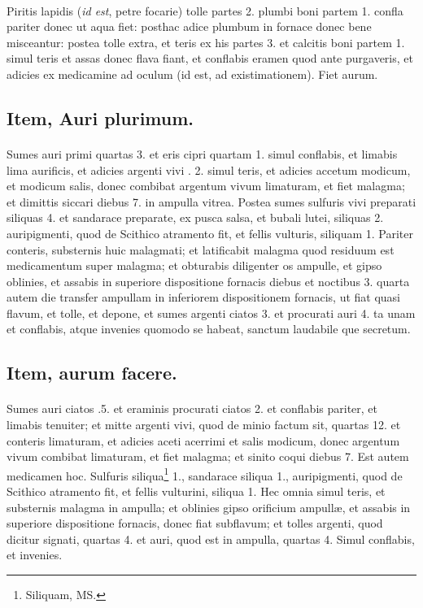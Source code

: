 \documentclass[a4paper, 11pt, oneside, polutonikogreek, italian]{article}
\begin{document}
\paragraph{}
Piritis lapidis (\emph{id est}, petre focarie) tolle partes 2. plumbi boni partem 1. confla pariter donec ut aqua fiet: posthac adice plumbum in fornace donec bene misceantur: postea tolle extra, et teris ex his partes 3. et calcitis boni partem 1. simul teris et assas donec flava fiant, et conflabis eramen quod ante purgaveris, et adicies ex medicamine ad oculum (id est, ad existimationem). Fiet aurum.

\subsection{Item, Auri plurimum.}
\paragraph{}
Sumes auri primi quartas 3. et eris cipri quartam 1. simul conflabis, et limabis lima aurificis, et adicies argenti vivi \roundz. 2. simul teris, et adicies accetum modicum, et modicum salis, donec combibat argentum vivum limaturam, et fiet malagma; et dimittis siccari diebus 7. in ampulla vitrea. Postea sumes sulfuris vivi preparati siliquas 4. et sandarace preparate, ex pusca salsa, et bubali lutei, siliquas 2. auripigmenti, quod de Scithico atramento fit, et fellis vulturis, siliquam 1. Pariter conteris, substernis huic malagmati; et latificabit malagma quod residuum est medicamentum super malagma; et obturabis diligenter os ampulle, et gipso oblinies, et assabis in superiore dispositione fornacis diebus et noctibus 3. quarta autem die transfer ampullam in inferiorem dispositionem fornacis, ut fiat quasi flavum, et tolle, et depone, et sumes argenti ciatos 3. et procurati auri 4. ta unam et conflabis, atque invenies quomodo se habeat, sanctum laudabile que secretum.

\subsection{Item, aurum facere.}
\paragraph{}
Sumes auri ciatos .5. et eraminis procurati ciatos 2. et conflabis pariter, et limabis tenuiter; et mitte argenti vivi, quod de minio factum sit, quartas 12. et conteris limaturam, et adicies aceti acerrimi et salis modicum, donec argentum vivum combibat limaturam, et fiet malagma; et sinito coqui diebus 7. Est autem medicamen hoc. Sulfuris siliqua\footnote{Siliquam, MS.} 1., sandarace siliqua 1., auripigmenti, quod de Scithico atramento fit, et fellis vulturini, siliqua 1. Hec omnia simul teris, et substernis malagma in ampulla; et oblinies gipso orificium ampullæ, et assabis in superiore dispositione fornacis, donec fiat subflavum; et tolles argenti, quod dicitur signati, quartas 4. et auri, quod est in ampulla, quartas 4. Simul conflabis, et invenies.
\end{document}
